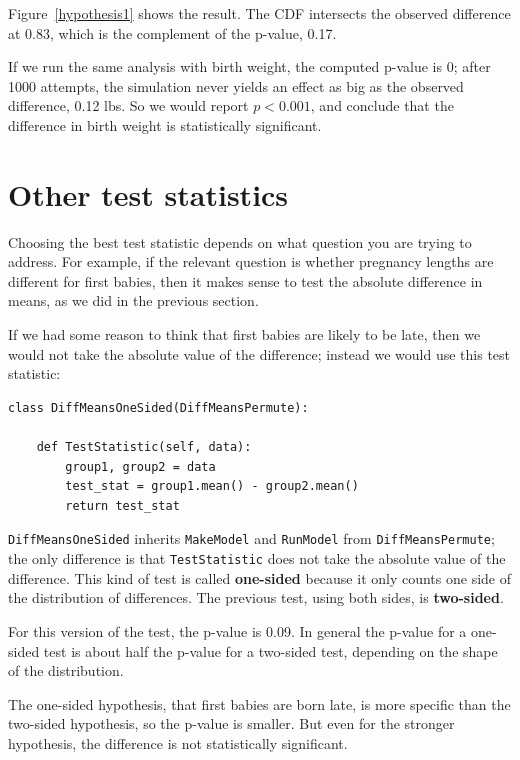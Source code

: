 \documentclass[12pt]{book}
\begin{document}
Figure~\ref{hypothesis1} shows the result.  The CDF intersects the
observed difference at 0.83, which is the complement of the p-value,
0.17.

If we run the same analysis with birth weight, the computed p-value
is 0; after 1000 attempts,
the simulation never yields an effect
as big as the observed difference, 0.12 lbs.  So we would
report $p < 0.001$, and
conclude that the difference in birth weight is statistically
significant.
   


\section{Other test statistics}

Choosing the best test statistic depends on what question you are
trying to address.  For example, if the relevant question is whether
pregnancy lengths are different for first
babies, then it makes sense to test the absolute difference in means,
as we did in the previous section.

If we had some reason to think that first babies are likely
to be late, then we would not take the absolute value of the difference;
instead we would use this test statistic:

\begin{verbatim}
class DiffMeansOneSided(DiffMeansPermute):

    def TestStatistic(self, data):
        group1, group2 = data
        test_stat = group1.mean() - group2.mean()
        return test_stat
\end{verbatim}

{\tt DiffMeansOneSided} inherits {\tt MakeModel} and {\tt RunModel}
from {\tt DiffMeansPermute}; the only difference is that
{\tt TestStatistic} does not take the absolute value of the
difference.  This kind of test is called {\bf one-sided} because
it only counts one side of the distribution of differences.  The
previous test, using both sides, is {\bf two-sided}.

For this version of the test, the p-value is 0.09.  In general
the p-value for a one-sided test is about half the p-value for
a two-sided test, depending on the shape of the distribution.

The one-sided hypothesis, that first babies are born late, is more
specific than the two-sided hypothesis, so the p-value is smaller.
But even for the stronger hypothesis, the difference is
not statistically significant.
   
\end{document}
